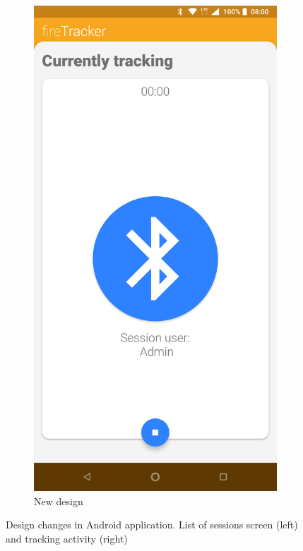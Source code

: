 \documentclass[../Main/thesis.tex]{subfiles}
\begin{document}
\begin{figure}[h]
\begin{subfigure}{0.2\textwidth}
		\includegraphics[width=\textwidth]{../fig/firetracker_app_new_2}
		\caption{New design}
		\label{fig:app-new-design-tracking-iteration3}
	\end{subfigure}
	\caption[Design changes in Android application]{Design changes in Android application. List of sessions screen (left) and tracking activity (right)}
	\label{fig:app-first-prototype}
\end{figure}
\end{document}

